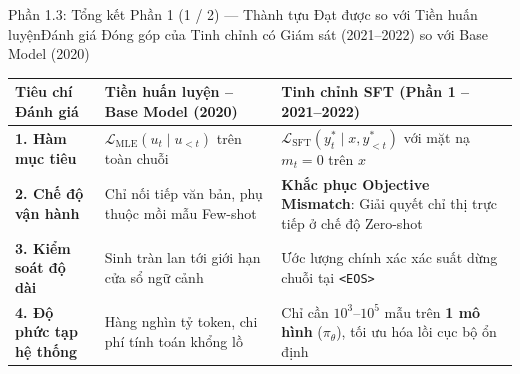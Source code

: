 \begin{frame}{Phần 1.3: Tổng kết Phần 1 (1 / 2) --- Thành tựu Đạt được so với Tiền huấn luyện}{Đánh giá Đóng góp của Tinh chỉnh có Giám sát (2021--2022) so với Base Model (2020)}
  \vspace{0.05cm}
  \footnotesize
  \renewcommand{\arraystretch}{1.32}
  \begin{tabularx}{\textwidth}{@{}p{3.4cm} X X@{}}
    \toprule
    \textbf{Tiêu chí Đánh giá} & \textbf{Tiền huấn luyện -- Base Model (2020)} & \textbf{Tinh chỉnh SFT (Phần 1 -- 2021--2022)} \\
    \midrule
    \textbf{1. Hàm mục tiêu} & $\mathcal{L}_{\text{MLE}}(u_t \mid u_{<t})$ trên toàn chuỗi & $\mathcal{L}_{\text{SFT}}(y_t^* \mid x, y_{<t}^*)$ với mặt nạ $m_t = 0$ trên $x$ \\
    \hline
    \textbf{2. Chế độ vận hành} & Chỉ nối tiếp văn bản, phụ thuộc mồi mẫu Few-shot & \textbf{\textcolor{tealgreen}{Khắc phục Objective Mismatch}}: Giải quyết chỉ thị trực tiếp ở chế độ Zero-shot \\
    \hline
    \textbf{3. Kiểm soát độ dài} & Sinh tràn lan tới giới hạn cửa sổ ngữ cảnh & Ước lượng chính xác xác suất dừng chuỗi tại \texttt{<EOS>} \\
    \hline
    \textbf{4. Độ phức tạp hệ thống} & Hàng nghìn tỷ token, chi phí tính toán khổng lồ & Chỉ cần $10^3\text{--}10^5$ mẫu trên \textbf{1 mô hình} ($\pi_\theta$), tối ưu hóa lồi cục bộ ổn định \\
    \bottomrule
  \end{tabularx}
\end{frame}

